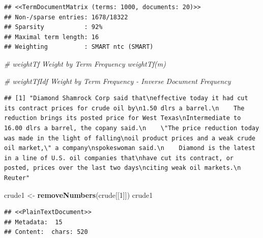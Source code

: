 \documentclass[]{book}
\newenvironment{Shaded}{\begin{snugshade}}{\end{snugshade}}
\newcommand{\KeywordTok}[1]{\textcolor[rgb]{0.13,0.29,0.53}{\textbf{{#1}}}}
\newcommand{\DecValTok}[1]{\textcolor[rgb]{0.00,0.00,0.81}{{#1}}}
\newcommand{\StringTok}[1]{\textcolor[rgb]{0.31,0.60,0.02}{{#1}}}
\newcommand{\CommentTok}[1]{\textcolor[rgb]{0.56,0.35,0.01}{\textit{{#1}}}}
\newcommand{\NormalTok}[1]{{#1}}
\begin{document}
\begin{verbatim}
## <<TermDocumentMatrix (terms: 1000, documents: 20)>>
## Non-/sparse entries: 1678/18322
## Sparsity           : 92%
## Maximal term length: 16
## Weighting          : SMART ntc (SMART)
\end{verbatim}

\begin{Shaded}
\begin{Highlighting}[]
\CommentTok{# weightTf Weight by Term Frequency   weightTf(m)}

\CommentTok{# weightTfIdf Weight by Term Frequency - Inverse Document Frequency}
\end{Highlighting}
\end{Shaded}

\begin{Shaded}
\end{Shaded}

\begin{verbatim}
## [1] "Diamond Shamrock Corp said that\neffective today it had cut its contract prices for crude oil by\n1.50 dlrs a barrel.\n    The reduction brings its posted price for West Texas\nIntermediate to 16.00 dlrs a barrel, the copany said.\n    \"The price reduction today was made in the light of falling\noil product prices and a weak crude oil market,\" a company\nspokeswoman said.\n    Diamond is the latest in a line of U.S. oil companies that\nhave cut its contract, or posted, prices over the last two days\nciting weak oil markets.\n Reuter"
\end{verbatim}

\begin{Shaded}
\begin{Highlighting}[]
\NormalTok{crude1 <-}\StringTok{ }\KeywordTok{removeNumbers}\NormalTok{(crude[[}\DecValTok{1}\NormalTok{]])}
\NormalTok{crude1}
\end{Highlighting}
\end{Shaded}

\begin{verbatim}
## <<PlainTextDocument>>
## Metadata:  15
## Content:  chars: 520
\end{verbatim}

\begin{Shaded}
\end{Shaded}
\end{document}
